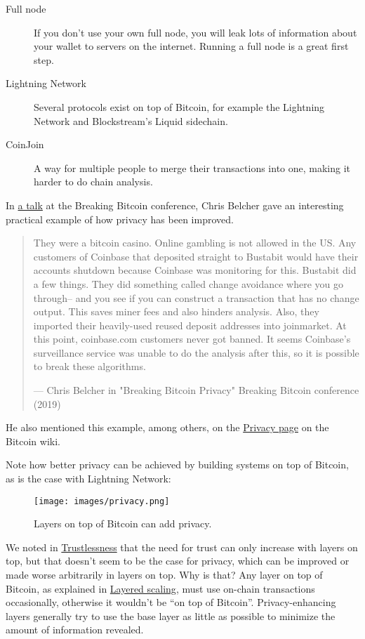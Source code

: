 \begin{description}
\item[Full node]
If you don't use your own full node, you will leak lots of information
about your wallet to servers on the internet. Running a full node is a
great first step.
\item[Lightning Network]
Several protocols exist on top of Bitcoin, for example the Lightning
Network and Blockstream's Liquid sidechain.
\item[CoinJoin]
A way for multiple people to merge their transactions into one, making
it harder to do chain analysis.
\end{description}

In
\href{https://btctranscripts.com/breaking-bitcoin/2019/breaking-bitcoin-privacy/}{a
talk} at the Breaking Bitcoin conference, Chris Belcher gave an
interesting practical example of how privacy has been improved.

\begin{quote}
They were a bitcoin casino. Online gambling is not allowed in the US.
Any customers of Coinbase that deposited straight to Bustabit would have
their accounts shutdown because Coinbase was monitoring for this.
Bustabit did a few things. They did something called change avoidance
where you go through-- and you see if you can construct a transaction
that has no change output. This saves miner fees and also hinders
analysis. Also, they imported their heavily-used reused deposit
addresses into joinmarket. At this point, coinbase.com customers never
got banned. It seems Coinbase's surveillance service was unable to do
the analysis after this, so it is possible to break these algorithms.

---  Chris Belcher in "Breaking Bitcoin Privacy" Breaking Bitcoin
conference (2019)
\end{quote}

He also mentioned this example, among others, on the
\href{https://en.bitcoin.it/Privacy}{Privacy page} on the Bitcoin wiki.

Note how better privacy can be achieved by building systems on top of
Bitcoin, as is the case with Lightning Network:

\begin{figure}
\centering
\texttt{[image: images/privacy.png]}
\caption{Layers on top of Bitcoin can add privacy.}
\end{figure}

We noted in \protect\hyperlink{trustlessness}{Trustlessness} that the
need for trust can only increase with layers on top, but that doesn't
seem to be the case for privacy, which can be improved or made worse
arbitrarily in layers on top. Why is that? Any layer on top of Bitcoin,
as explained in \protect\hyperlink{layeredscaling}{Layered scaling},
must use on-chain transactions occasionally, otherwise it wouldn't be
``on top of Bitcoin''. Privacy-enhancing layers generally try to use the
base layer as little as possible to minimize the amount of information
revealed.

